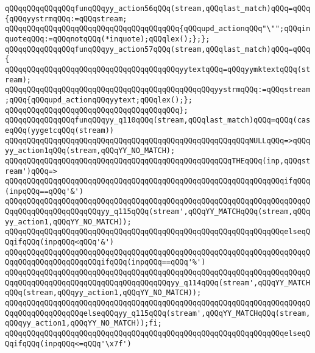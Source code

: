 \verb|qQQqqQQqqQQqqQQqfunqQQqyy_action56qQQq(stream,qQQqlast_match)qQQq=qQQq{qQQqyystrmqQQq:=qQQqstream;|\newline
\verb|qQQqqQQqqQQqqQQqqQQqqQQqqQQqqQQqqQQqqQQq{qQQqupd_actionqQQq"\"";qQQqinquoteqQQq:=qQQqnotqQQq(*inquote);qQQqlex();};};|\newline
\verb|qQQqqQQqqQQqqQQqfunqQQqyy_action57qQQq(stream,qQQqlast_match)qQQq=qQQq{|\newline
\verb|qQQqqQQqqQQqqQQqqQQqqQQqqQQqqQQqqQQqqQQqyytextqQQq=qQQqyymktextqQQq(stream);|\newline
\newline
\verb|qQQqqQQqqQQqqQQqqQQqqQQqqQQqqQQqqQQqqQQqqQQqqQQqyystrmqQQq:=qQQqstream;qQQq{qQQqupd_actionqQQqyytext;qQQqlex();};|\newline
\verb|qQQqqQQqqQQqqQQqqQQqqQQqqQQqqQQqqQQqqQQq};|\newline
\verb|qQQqqQQqqQQqqQQqfunqQQqyy_q110qQQq(stream,qQQqlast_match)qQQq=qQQq(caseqQQq(yygetcqQQq(stream))|\newline
\verb|qQQqqQQqqQQqqQQqqQQqqQQqqQQqqQQqqQQqqQQqqQQqqQQqqQQqqQQqNULLqQQq=>qQQqyy_action1qQQq(stream,qQQqYY_NO_MATCH);|\newline
\verb|qQQqqQQqqQQqqQQqqQQqqQQqqQQqqQQqqQQqqQQqqQQqqQQqqQQqTHEqQQq(inp,qQQqstream')qQQq=>|\newline
\verb|qQQqqQQqqQQqqQQqqQQqqQQqqQQqqQQqqQQqqQQqqQQqqQQqqQQqqQQqqQQqqQQqifqQQq(inpqQQq==qQQq'&')|\newline
\verb|qQQqqQQqqQQqqQQqqQQqqQQqqQQqqQQqqQQqqQQqqQQqqQQqqQQqqQQqqQQqqQQqqQQqqQQqqQQqqQQqqQQqqQQqqQQqyy_q115qQQq(stream',qQQqYY_MATCHqQQq(stream,qQQqyy_action1,qQQqYY_NO_MATCH));|\newline
\verb|qQQqqQQqqQQqqQQqqQQqqQQqqQQqqQQqqQQqqQQqqQQqqQQqqQQqqQQqqQQqqQQqelseqQQqifqQQq(inpqQQq<qQQq'&')|\newline
\verb|qQQqqQQqqQQqqQQqqQQqqQQqqQQqqQQqqQQqqQQqqQQqqQQqqQQqqQQqqQQqqQQqqQQqqQQqqQQqqQQqqQQqqQQqqQQqifqQQq(inpqQQq==qQQq'%')|\newline
\verb|qQQqqQQqqQQqqQQqqQQqqQQqqQQqqQQqqQQqqQQqqQQqqQQqqQQqqQQqqQQqqQQqqQQqqQQqqQQqqQQqqQQqqQQqqQQqqQQqqQQqqQQqqQQqyy_q114qQQq(stream',qQQqYY_MATCHqQQq(stream,qQQqyy_action1,qQQqYY_NO_MATCH));|\newline
\verb|qQQqqQQqqQQqqQQqqQQqqQQqqQQqqQQqqQQqqQQqqQQqqQQqqQQqqQQqqQQqqQQqqQQqqQQqqQQqqQQqqQQqqQQqelseqQQqyy_q115qQQq(stream',qQQqYY_MATCHqQQq(stream,qQQqyy_action1,qQQqYY_NO_MATCH));fi;|\newline
\verb|qQQqqQQqqQQqqQQqqQQqqQQqqQQqqQQqqQQqqQQqqQQqqQQqqQQqqQQqqQQqqQQqelseqQQqifqQQq(inpqQQq<=qQQq'\x7f')|\newline
